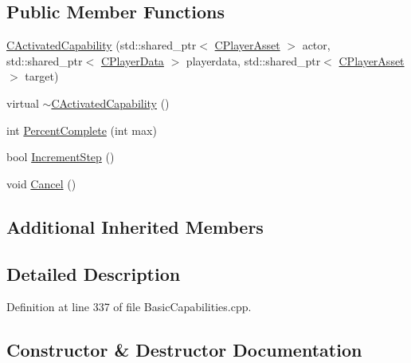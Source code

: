 \subsection*{Public Member Functions}
\begin{DoxyCompactItemize}
\item 
\hyperlink{classCPlayerCapabilityCancel_1_1CActivatedCapability_a162c079742719fda7b641dcd877b6854}{C\+Activated\+Capability} (std\+::shared\+\_\+ptr$<$ \hyperlink{classCPlayerAsset}{C\+Player\+Asset} $>$ actor, std\+::shared\+\_\+ptr$<$ \hyperlink{classCPlayerData}{C\+Player\+Data} $>$ playerdata, std\+::shared\+\_\+ptr$<$ \hyperlink{classCPlayerAsset}{C\+Player\+Asset} $>$ target)
\item 
virtual \hyperlink{classCPlayerCapabilityCancel_1_1CActivatedCapability_ae0d7d8f36d4ac21c04d68dc6ad2ae9c4}{$\sim$\+C\+Activated\+Capability} ()
\item 
int \hyperlink{classCPlayerCapabilityCancel_1_1CActivatedCapability_a69d2fec27186cba11ab545560e7bf45d}{Percent\+Complete} (int max)
\item 
bool \hyperlink{classCPlayerCapabilityCancel_1_1CActivatedCapability_a28351293b3a662bca20a2d666b8801e1}{Increment\+Step} ()
\item 
void \hyperlink{classCPlayerCapabilityCancel_1_1CActivatedCapability_accd67b449574b6c99e21f522d13bc96a}{Cancel} ()
\end{DoxyCompactItemize}
\subsection*{Additional Inherited Members}


\subsection{Detailed Description}


Definition at line 337 of file Basic\+Capabilities.\+cpp.



\subsection{Constructor \& Destructor Documentation}
\hypertarget{classCPlayerCapabilityCancel_1_1CActivatedCapability_a162c079742719fda7b641dcd877b6854}{}\label{classCPlayerCapabilityCancel_1_1CActivatedCapability_a162c079742719fda7b641dcd877b6854} 
